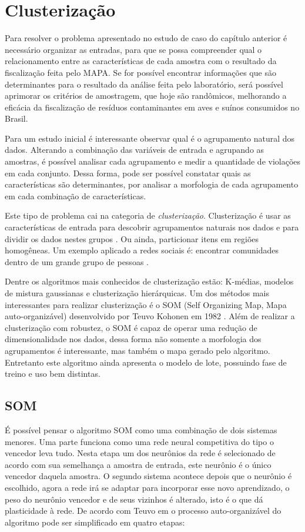 \chapter{Clusterização}
Para resolver o problema apresentado no estudo de caso do capítulo anterior é necessário organizar as entradas, para que se possa compreender qual o relacionamento entre as características de cada amostra com o resultado da fiscalização feita pelo MAPA. Se for possível encontrar informações que são determinantes para o resultado da análise feita pelo laboratório, será possível aprimorar os critérios de amostragem, que hoje são randômicos, melhorando a eficácia da fiscalização de resíduos contaminantes em aves e suínos consumidos no Brasil.

Para um estudo inicial é interessante observar qual é o agrupamento natural dos dados. Alterando a combinação das variáveis de entrada e agrupando as amostras, é possível analisar cada agrupamento e medir a quantidade de violações em cada conjunto. Dessa forma, pode ser possível constatar quais as características são determinantes, por analisar a morfologia de cada agrupamento em cada combinação de características.

Este tipo de problema cai na categoria de \textit{clusterização}. Clusterização é usar as características de entrada para descobrir agrupamentos naturais nos dados e para dividir os dados nestes grupos \cite{real2013}. Ou ainda, particionar itens em regiões homogêneas. Um exemplo aplicado a redes sociais é: encontrar comunidades dentro de um grande grupo de pessoas \cite{foundations2012}.

Dentre os algoritmos mais conhecidos de clusterização estão: K-médias, modelos de mistura gaussianas e clusterização hierárquicas. Um dos métodos mais interessantes para realizar clusterização é o SOM (Self Organizing Map, Mapa auto-organizável) desenvolvido por Teuvo Kohonen em 1982 \cite{kohonen1982}. Além de realizar a clusterização com robustez, o SOM é capaz de operar uma redução de dimensionalidade nos dados, dessa forma não somente a morfologia dos agrupamentos é interessante, mas também o mapa gerado pelo algoritmo. Entretanto este algoritmo ainda apresenta o modelo de lote, possuindo fase de treino e uso bem distintas.

\section{SOM}
É possível pensar o algoritmo SOM como uma combinação de dois sistemas menores. Uma parte funciona como uma rede neural competitiva do tipo o vencedor leva tudo. Nesta etapa um dos neurônios da rede é selecionado de acordo com sua semelhança a amostra de entrada, este neurônio é o único vencedor daquela amostra. O segundo sistema acontece depois que o neurônio é escolhido, agora a rede irá se adaptar para incorporar esse novo aprendizado, o peso do neurônio vencedor e de seus vizinhos é alterado, isto é o que dá plasticidade à rede. 
De acordo com Teuvo em  o processo auto-organizável do algoritmo pode ser simplificado em quatro etapas:


